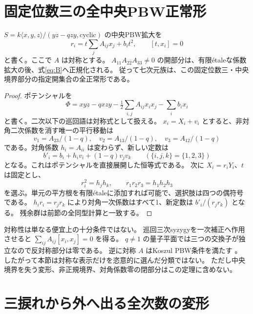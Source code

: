 \section{固定位数三の全中央PBW正常形}\label{sec:normal}
\begin{theorem}\label{thm:normal}
$S=k\langle x,y,z\rangle/(yz-qzy,\mathrm{cyclic})$ の中央PBW拡大を
\[
r_i=t\sum_jA_{ij}x_j+b_it^2,\qquad [t,x_i]=0
\]
と書く。ここで $A$ は対称とする。
$A_{11}A_{22}A_{33}\ne0$ の開部分は、有限\'{e}taleな係数拡大の後、式\eqref{eq:B}へ正規化される。
従って七次元族は、この固定位数三・中央境界部分の指定開集合の全正常形である。
\end{theorem}
\begin{proof}
ポテンシャルを
\[
\Phi=xyz-qxzy-\tfrac12\sum_{i,j}A_{ij}x_ix_j-\sum_i b_ix_i
\]
と書く。二次以下の巡回語は対称式として扱える。
$x_i=X_i+v_i$ とすると、非対角二次係数を消す唯一の平行移動は
\[
v_1=A_{23}/(1-q),\quad v_2=A_{13}/(1-q),\quad v_3=A_{12}/(1-q)
\]
である。対角係数 $h_i=A_{ii}$ は変わらず、新しい定数は
\[
b'_i=b_i+h_iv_i+(1-q)v_jv_k\qquad(\{i,j,k\}=\{1,2,3\})
\]
となる。これはポテンシャルを直接展開した恒等式である。
次に $X_i=r_iY_i$、$t$ は固定とし、
\[
r_i^2=h_jh_k,\qquad r_1r_2r_3=h_1h_2h_3
\]
を選ぶ。単元の平方根を有限\'{e}taleに添加すれば可能で、選択肢は四つの偶符号である。
$h_ir_i=r_jr_k$ により対角一次係数はすべて1、新定数は $b'_i/(r_jr_k)$ となる。
残余群は前節の全同型計算と一致する。
\end{proof}

対称性は単なる便宜上の十分条件ではない。
巡回三次syzygyを一次補正へ作用させると
$\sum_{ij}A_{ij}[x_i,x_j]=0$ を得る。
$q\ne1$ の量子平面では三つの交換子が独立なので反対称部分は零である。
逆に対称 $A$ はKoszul PBW条件を満たす \cite{BG,EG}。
したがって本節は対称な表示だけを恣意的に選んだ分類ではない。
ただし中央境界を失う変形、非正規境界、対角係数零の閉部分はこの定理に含めない。

\section{三捩れから外へ出る全次数の変形}\label{sec:integrate}
